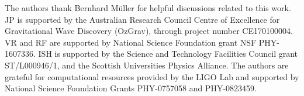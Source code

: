 \documentclass[letterpaper, aps, prd, twocolumn, superscriptaddress, showpacs, nofootinbib]{revtex4}
\begin{document}
\begin{acknowledgments}
The authors thank Bernhard M\"uller for helpful discussions related to this work. 
JP is supported by the Australian Research Council Centre of Excellence for Gravitational Wave Discovery (OzGrav), through project number CE170100004. VR and RF are supported by National Science Foundation grant NSF PHY-1607336. ISH is supported by the Science and Technology Facilities Council grant ST/L000946/1, and the Scottish Universities Physics Alliance. The authors are grateful for computational resources provided by the LIGO Lab and supported by National Science Foundation Grants PHY-0757058 and PHY-0823459. 
\end{acknowledgments}





\end{document}
